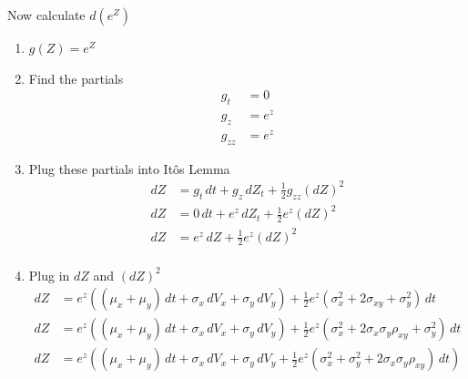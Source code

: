 \documentclass[11pt]{article}
\begin{document}
Now calculate $d(e^Z)$

\begin{enumerate}
    \item $g(Z) = e^Z$
    \item Find the partials 
    \begin{align*}
        g_t &= 0 \\ 
        g_z &= e^z \\ 
        g_{zz} &= e^z 
    \end{align*}
    \item Plug these partials into It\^{o}s Lemma
    \begin{align*}
        dZ &= g_t \,dt + g_z \,dZ_t + \frac{1}{2} g_{zz} {(dZ)}^2 \\
        dZ &= 0 \,dt + e^z \,dZ_t + \frac{1}{2} e^{z} {(dZ)}^2 \\
        dZ &= e^z \,dZ + \frac{1}{2} e^{z} {(dZ)}^2 \\
    \end{align*}
    \item Plug in $dZ$ and ${(dZ)}^2$
    \begin{align*}
        dZ &= e^z ((\mu_x + \mu_y)\,dt + \sigma_x\,dV_x + \sigma_y\,dV_y) + \frac{1}{2} e^{z} 
        {(\sigma_x^2 + 2 \sigma_{xy} + \sigma_y^2)} \,dt \\
        dZ &= e^z ((\mu_x + \mu_y)\,dt + \sigma_x\,dV_x + \sigma_y\,dV_y) + \frac{1}{2} e^{z} 
        {(\sigma_x^2 + 2 \sigma_x \sigma_y \rho_{xy} + \sigma_y^2)} \,dt \\
        dZ &= e^z ((\mu_x + \mu_y)\,dt + \sigma_x\,dV_x + \sigma_y\,dV_y + \frac{1}{2} e^{z} 
        {(\sigma_x^2 + \sigma_y^2 + 2 \sigma_x \sigma_y \rho_{xy})} \,dt) \\
    \end{align*}
\end{enumerate}
\end{document}
